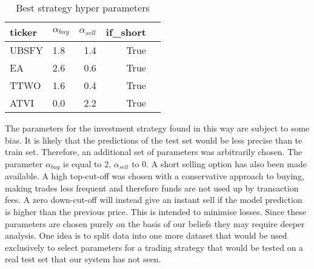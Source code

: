 \documentclass[11pt]{article} %
\begin{document}
\begin{table}[H]
\centering
\caption{Best strategy hyper parameters}
\begin{tabular}{llrrl}
\toprule
 ticker &  $\alpha_{buy}$ &  $\alpha_{sell}$  &  if\_short \\
\midrule
  UBSFY &          1.8 &           1.4 &      True \\
     EA &          2.6 &           0.6 &      True \\
   TTWO &          1.6 &           0.4 &      True \\
   ATVI &          0.0 &           2.2 &      True \\
\bottomrule
\end{tabular}
\end{table}


The parameters for the investment strategy found in this way are subject to some bias. It is likely that the predictions of the test set would be less precise than te train set. Therefore, an additional set of parameters was arbitrarily chosen. The parameter $\alpha_{buy}$  is equal to 2, $\alpha_{sell}$  to 0. A short selling option has also been made available.  A high top-cut-off was chosen with a conservative approach to buying, making trades less frequent and therefore funds are not used up by transaction fees. A zero down-cut-off will instead give an instant sell if the model prediction is higher than the previous price. This is intended to minimise losses. Since these parameters are chosen purely on the basis of our beliefs they may require deeper analysis. One idea is to split data into one more dataset that would be used exclusively to select parameters for a trading strategy that would be tested on a real test set that our system has not seen. 
\end{document}
